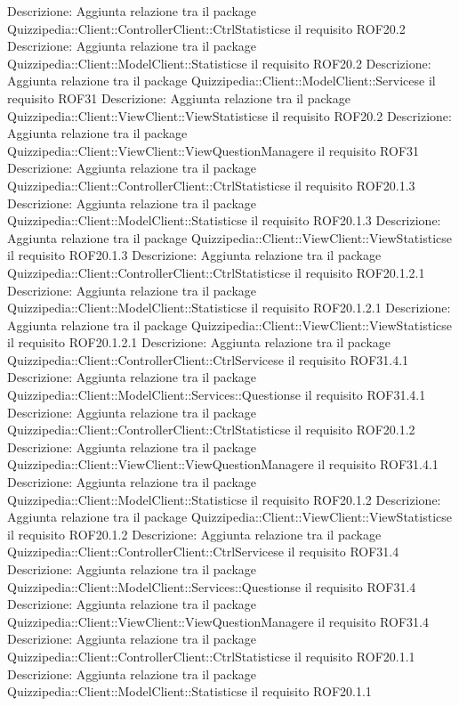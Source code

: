 Descrizione: Aggiunta relazione tra il package Quizzipedia::Client::ControllerClient::CtrlStatisticse il requisito ROF20.2 
Descrizione: Aggiunta relazione tra il package Quizzipedia::Client::ModelClient::Statisticse il requisito ROF20.2 
Descrizione: Aggiunta relazione tra il package Quizzipedia::Client::ModelClient::Servicese il requisito ROF31 
Descrizione: Aggiunta relazione tra il package Quizzipedia::Client::ViewClient::ViewStatisticse il requisito ROF20.2 
Descrizione: Aggiunta relazione tra il package Quizzipedia::Client::ViewClient::ViewQuestionManagere il requisito ROF31 
Descrizione: Aggiunta relazione tra il package Quizzipedia::Client::ControllerClient::CtrlStatisticse il requisito ROF20.1.3 
Descrizione: Aggiunta relazione tra il package Quizzipedia::Client::ModelClient::Statisticse il requisito ROF20.1.3 
Descrizione: Aggiunta relazione tra il package Quizzipedia::Client::ViewClient::ViewStatisticse il requisito ROF20.1.3 
Descrizione: Aggiunta relazione tra il package Quizzipedia::Client::ControllerClient::CtrlStatisticse il requisito ROF20.1.2.1 
Descrizione: Aggiunta relazione tra il package Quizzipedia::Client::ModelClient::Statisticse il requisito ROF20.1.2.1 
Descrizione: Aggiunta relazione tra il package Quizzipedia::Client::ViewClient::ViewStatisticse il requisito ROF20.1.2.1 
Descrizione: Aggiunta relazione tra il package Quizzipedia::Client::ControllerClient::CtrlServicese il requisito ROF31.4.1 
Descrizione: Aggiunta relazione tra il package Quizzipedia::Client::ModelClient::Services::Questionse il requisito ROF31.4.1 
Descrizione: Aggiunta relazione tra il package Quizzipedia::Client::ControllerClient::CtrlStatisticse il requisito ROF20.1.2 
Descrizione: Aggiunta relazione tra il package Quizzipedia::Client::ViewClient::ViewQuestionManagere il requisito ROF31.4.1 
Descrizione: Aggiunta relazione tra il package Quizzipedia::Client::ModelClient::Statisticse il requisito ROF20.1.2 
Descrizione: Aggiunta relazione tra il package Quizzipedia::Client::ViewClient::ViewStatisticse il requisito ROF20.1.2 
Descrizione: Aggiunta relazione tra il package Quizzipedia::Client::ControllerClient::CtrlServicese il requisito ROF31.4 
Descrizione: Aggiunta relazione tra il package Quizzipedia::Client::ModelClient::Services::Questionse il requisito ROF31.4 
Descrizione: Aggiunta relazione tra il package Quizzipedia::Client::ViewClient::ViewQuestionManagere il requisito ROF31.4 
Descrizione: Aggiunta relazione tra il package Quizzipedia::Client::ControllerClient::CtrlStatisticse il requisito ROF20.1.1 
Descrizione: Aggiunta relazione tra il package Quizzipedia::Client::ModelClient::Statisticse il requisito ROF20.1.1 
